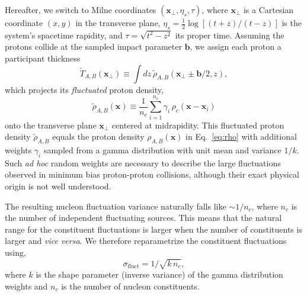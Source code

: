 \documentclass[aps,prc,reprint,amsmath,nofootinbib]{revtex4-1}
\newcommand{\T}{\tilde{T}}
\newcommand{\bv}{\mathbf b}
\newcommand{\xv}{\mathbf x}
\begin{document}
Hereafter, we switch to Milne coordinates $(\xv_\perp, \eta_s, \tau)$, where $\xv_\perp$ is a Cartesian coordinate $(x, y)$ in the transverse plane, $\eta_s = \tfrac{1}{2} \log[(t+z)/(t-z)]$ is the system's spacetime rapidity, and $\tau = \sqrt{t^2 - z^2}$ its proper time.
Assuming the protons collide at the sampled impact parameter $\bv$, we assign each proton a participant thickness
\begin{equation}
  \label{eq:fluctuated_thick}
  \T_{A, B}(\xv_\perp) \equiv \int dz\, \tilde{\rho}_{A,B}(\xv_\perp \pm \bv/2, z),
\end{equation}
which projects its \emph{fluctuated} proton density,
\begin{equation}
  \tilde{\rho}_{A,B}(\xv) \equiv \frac{1}{n_c} \sum\limits_{i=1}^{n_c} \gamma_i\, \rho_c(\xv - \xv_i)
\end{equation}
onto the transverse plane $\xv_\perp$ centered at midrapidity.
This fluctuated proton density $\tilde{\rho}_{A,B}$ equals the proton density $\rho_{A,B}(\xv)$ in Eq.~\eqref{eq:rho} with additional weights $\gamma_i$ sampled from a gamma distribution with unit mean and variance $1/k$.
Such \emph{ad hoc} random weights are necessary to describe the large fluctuations observed in minimum bias proton-proton collisions, although their exact physical origin is not well understood.

The resulting nucleon fluctuation variance naturally falls like ${\sim}1/ n_c$, where $n_c$ is the number of independent fluctuating sources.
This means that the natural range for the constituent fluctuations is larger when the number of constituents is larger and \emph{vice versa}.
We therefore reparametrize the constituent fluctuations using,
\begin{equation}
  \sigma_\mathrm{fluct} = 1 / \sqrt{k\, n_c},
\end{equation}
where $k$ is the shape parameter (inverse variance) of the gamma distribution weights and $n_c$ is the number of nucleon constituents.
\end{document}
